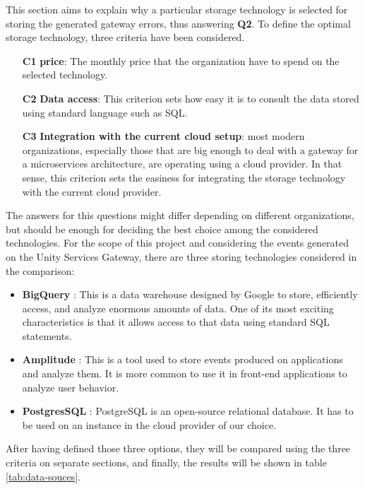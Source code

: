 \documentclass[english, 12pt, a4paper, sci, utf8, a-1b, online]{aaltothesis}
\begin{document}
This section aims to explain why a particular storage technology is selected for storing the generated gateway errors, thus answering \textbf{Q2}. To define the optimal storage technology, three criteria have been considered.

\begin{itemize}
    \item[\textbf{C1}] \textbf{price}: The monthly price that the organization have to spend on the selected technology.
    \item[\textbf{C2}] \textbf{Data access}: This criterion sets how easy it is to consult the data stored using standard language such as SQL.
    \item[\textbf{C3}] \textbf{Integration with the current cloud setup}: most modern organizations, especially those that are big enough to deal with a gateway for a microservices architecture, are operating using a cloud provider. In that sense, this criterion sets the easiness for integrating the storage technology with the current cloud provider.
\end{itemize}

The answers for this questions might differ depending on different organizations, but should be enough for deciding the best choice among the considered technologies. For the scope of this project and considering the events generated on the Unity Services Gateway, there are three storing technologies considered in the comparison:

\begin{itemize}
    \item \textbf{BigQuery} \cite{BigQuery}: This is a data warehouse designed by Google to store, efficiently access, and analyze enormous amounts of data. One of its most exciting characteristics is that it allows access to that data using standard SQL statements.
    \item \textbf{Amplitude} \cite{Amplitude}: This is a tool used to store events produced on applications and analyze them. It is more common to use it in front-end applications to analyze user behavior.
    \item \textbf{PostgresSQL} \cite{PostgreSQL}: PostgreSQL is an open-source relational database. It has to be used on an instance in the cloud provider of our choice.
\end{itemize}

After having defined those three options, they will be compared using the three criteria on separate sections, and finally, the results will be shown in table \ref{tab:data-souces}.
\end{document}
